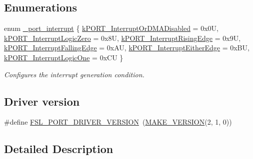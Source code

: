 \subsection*{Enumerations}
\begin{DoxyCompactItemize}
\item 
enum \mbox{\hyperlink{group__port_gafd69f8203c1c62d7c81088dc92423dce}{\+\_\+port\+\_\+interrupt}} \{ \newline
\mbox{\hyperlink{group__port_ggafd69f8203c1c62d7c81088dc92423dcea3a632495179d065e620ada24a6521ac6}{k\+P\+O\+R\+T\+\_\+\+Interrupt\+Or\+D\+M\+A\+Disabled}} = 0x0U, 
\mbox{\hyperlink{group__port_ggafd69f8203c1c62d7c81088dc92423dcea4001279f550382ce823ad62136970f14}{k\+P\+O\+R\+T\+\_\+\+Interrupt\+Logic\+Zero}} = 0x8U, 
\mbox{\hyperlink{group__port_ggafd69f8203c1c62d7c81088dc92423dcea2f8db24e21fd5fabfc8dc5250fbc6471}{k\+P\+O\+R\+T\+\_\+\+Interrupt\+Rising\+Edge}} = 0x9U, 
\mbox{\hyperlink{group__port_ggafd69f8203c1c62d7c81088dc92423dceafe8f52eaca9af2ce2087a2991f50c463}{k\+P\+O\+R\+T\+\_\+\+Interrupt\+Falling\+Edge}} = 0x\+AU, 
\newline
\mbox{\hyperlink{group__port_ggafd69f8203c1c62d7c81088dc92423dcea02b1f5ef221c395aa49960c8c32943d2}{k\+P\+O\+R\+T\+\_\+\+Interrupt\+Either\+Edge}} = 0x\+BU, 
\mbox{\hyperlink{group__port_ggafd69f8203c1c62d7c81088dc92423dceaa10b78a566c8439f00d14d18897f765c}{k\+P\+O\+R\+T\+\_\+\+Interrupt\+Logic\+One}} = 0x\+CU
 \}
\begin{DoxyCompactList}\small\item\em Configures the interrupt generation condition. \end{DoxyCompactList}\end{DoxyCompactItemize}
\subsection*{Driver version}
\begin{DoxyCompactItemize}
\item 
\#define \mbox{\hyperlink{group__port_ga75a0a23a423adf79cd0f83a5fa2567a3}{F\+S\+L\+\_\+\+P\+O\+R\+T\+\_\+\+D\+R\+I\+V\+E\+R\+\_\+\+V\+E\+R\+S\+I\+ON}}~(\mbox{\hyperlink{group__ftfx__utilities_ga812138aa3315b0c6953c1a26130bcc37}{M\+A\+K\+E\+\_\+\+V\+E\+R\+S\+I\+ON}}(2, 1, 0))
\end{DoxyCompactItemize}


\subsection{Detailed Description}


